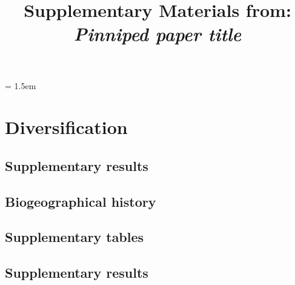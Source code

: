 \documentclass[a4paper, 12pt]{article}
\title{Supplementary Materials from: \textit{Pinniped paper title}}
\author{}
\date{}
\begin{document}
\maketitle

\tableofcontents

\parindent = 1.5em
\addtolength{\parskip}{.3em}

\newpage
\section{Diversification}
\subsection{Supplementary results}


\newpage
\begin{landscape}
\section{Biogeographical history}
\subsection{Supplementary tables}



\newpage


\newpage

\end{landscape}
\subsection{Supplementary results}
\end{document}
